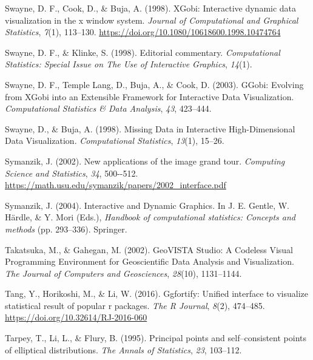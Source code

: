 \documentclass[
  letterpaper,
]{krantz}
\newlength{\cslhangindent}
\newlength{\cslentryspacingunit} %
\newenvironment{CSLReferences}[2] %
 {%
  \setlength{\parindent}{0pt}
  \ifodd #1
  \let\oldpar\par
  \def\par{\hangindent=\cslhangindent\oldpar}
  \fi
  \setlength{\parskip}{#2\cslentryspacingunit}
 }%
 {}
\begin{document}
\begin{CSLReferences}{1}{0}
\leavevmode{}%
Swayne, D. F., Cook, D., \& Buja, A. (1998). XGobi: Interactive dynamic
data visualization in the x window system. \emph{Journal of
Computational and Graphical Statistics}, \emph{7}(1), 113--130.
\url{https://doi.org/10.1080/10618600.1998.10474764}

\leavevmode{}%
Swayne, D. F., \& Klinke, S. (1998). Editorial commentary.
\emph{Computational Statistics: Special Issue on The Use of Interactive
Graphics}, \emph{14}(1).

\leavevmode{}%
Swayne, D. F., Temple Lang, D., Buja, A., \& Cook, D. (2003). {GG}obi:
{E}volving from {XG}obi into an {E}xtensible {F}ramework for
{I}nteractive {D}ata {V}isualization. \emph{Computational Statistics \&
Data Analysis}, \emph{43}, 423--444.

\leavevmode{}%
Swayne, D., \& Buja, A. (1998). {M}issing {D}ata in {I}nteractive
{H}igh-{D}imensional {D}ata {V}isualization. \emph{Computational
Statistics}, \emph{13}(1), 15--26.

\leavevmode{}%
Symanzik, J. (2002). New applications of the image grand tour.
\emph{Computing Science and Statistics}, \emph{34}, 500-\/-512.
\url{https://math.usu.edu/symanzik/papers/2002_interface.pdf}

\leavevmode{}%
Symanzik, J. (2004). Interactive and {D}ynamic {G}raphics. In J. E.
Gentle, W. Härdle, \& Y. Mori (Eds.), \emph{Handbook of computational
statistics: Concepts and methods} (pp. 293--336). Springer.

\leavevmode{}%
Takatsuka, M., \& Gahegan, M. (2002). {GeoVISTA Studio}: A {C}odeless
{V}isual {P}rogramming {E}nvironment for {G}eoscientific {D}ata
{A}nalysis and {V}isualization. \emph{The Journal of Computers and
Geosciences}, \emph{28}(10), 1131--1144.

\leavevmode{}%
Tang, Y., Horikoshi, M., \& Li, W. (2016). Ggfortify: Unified interface
to visualize statistical result of popular r packages. \emph{The R
Journal}, \emph{8}(2), 474--485.
\url{https://doi.org/10.32614/RJ-2016-060}

\leavevmode{}%
Tarpey, T., Li, L., \& Flury, B. (1995). Principal points and
self--consistent points of elliptical distributions. \emph{The Annals of
Statistics}, \emph{23}, 103--112.


\end{CSLReferences}
\end{document}
